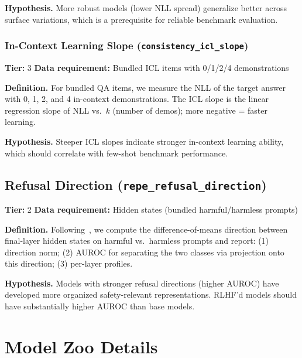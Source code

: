 \documentclass{article}
\begin{document}
\textbf{Hypothesis.} More robust models (lower NLL spread) generalize better across surface variations, which is a prerequisite for reliable benchmark evaluation.

\subsubsection{In-Context Learning Slope (\texttt{consistency\_icl\_slope})}
\label{app:icl-slope}

\textbf{Tier:} 3 \quad \textbf{Data requirement:} Bundled ICL items with 0/1/2/4 demonstrations

\textbf{Definition.} For bundled QA items, we measure the NLL of the target answer with 0, 1, 2, and 4 in-context demonstrations. The ICL slope is the linear regression slope of NLL vs.\ $k$ (number of demos); more negative = faster learning.

\textbf{Hypothesis.} Steeper ICL slopes indicate stronger in-context learning ability, which should correlate with few-shot benchmark performance.

\subsection{Refusal Direction (\texttt{repe\_refusal\_direction})}
\label{app:refusal}

\textbf{Tier:} 2 \quad \textbf{Data requirement:} Hidden states (bundled harmful/harmless prompts)

\textbf{Definition.} Following~\citet{arditi2024refusal}, we compute the difference-of-means direction between final-layer hidden states on harmful vs.\ harmless prompts and report: (1) direction norm; (2) AUROC for separating the two classes via projection onto this direction; (3) per-layer profiles.

\textbf{Hypothesis.} Models with stronger refusal directions (higher AUROC) have developed more organized safety-relevant representations. RLHF'd models should have substantially higher AUROC than base models.

\section{Model Zoo Details}
\label{app:models}
\end{document}
